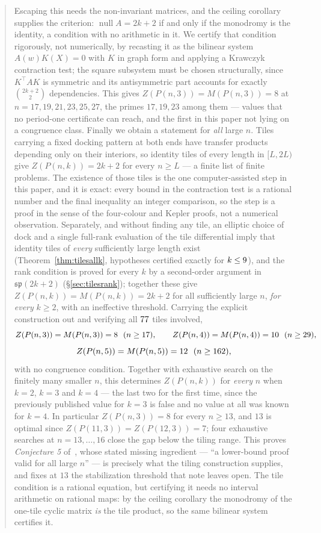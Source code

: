 \documentclass[11pt]{article}
\theoremstyle{definition}
\begin{document}
\begin{abstract}
Escaping this needs the non-invariant matrices, and the ceiling corollary
supplies the criterion: $\operatorname{null}A=2k+2$ if and only if the monodromy
is the identity, a condition with no arithmetic in it. We certify that condition
rigorously, not numerically, by recasting it as the bilinear system $A(w)K(X)=0$
with $K$ in graph form and applying a Krawczyk contraction test; the square
subsystem must be chosen structurally, since $K^{\!\top}\!AK$ is symmetric and
its antisymmetric part accounts for exactly $\binom{2k+2}2$ dependencies. This
gives $Z(P(n,3))=M(P(n,3))=8$ at $n=17,19,21,23,25,27$, the primes $17,19,23$
among them --- values that no period-one certificate can reach, and the first in
this paper not lying on a congruence class. Finally we obtain a statement for \emph{all}
large $n$. Tiles carrying a fixed docking pattern at both ends have transfer
products depending only on their interiors, so identity tiles of every length in
$[L,2L)$ give $Z(P(n,k))=2k+2$ for every $n\ge L$ --- a finite list of finite
problems. The existence of those tiles is the one computer-assisted step in
this paper, and it is exact: every bound in the contraction test is a rational
number and the final inequality an integer comparison, so the step is a proof
in the sense of the four-colour and Kepler proofs, not a numerical observation.
Separately, and without finding any tile, an elliptic choice of dock and a
single full-rank evaluation of the tile differential imply that identity tiles
of \emph{every} sufficiently large length exist (Theorem~\ref{thm:tilesallk},
hypotheses certified exactly for $k\le\TileAllK$), and the rank condition is proved for every $k$ by a second-order argument in
$\mathfrak{sp}(2k+2)$ (\S\ref{sec:tilesrank}); together these give
$Z(P(n,k))=M(P(n,k))=2k+2$ for all sufficiently large $n$, \emph{for every}
$k\ge2$, with an ineffective threshold. Carrying the explicit construction out and verifying all $\NtileAll$ tiles involved,
\[
  Z(P(n,3))=M(P(n,3))=8\ \ (n\ge17),\qquad
  Z(P(n,4))=M(P(n,4))=10\ \ (n\ge\SettleFour),
\]
\[
  Z(P(n,5))=M(P(n,5))=12\ \ (n\ge\SettleFive),
\]
with no congruence condition. Together with exhaustive search on the finitely
many smaller $n$, this determines $Z(P(n,k))$ for \emph{every} $n$ when $k=2$,
$k=3$ and $k=4$ --- the last two for the first time, since the previously
published value for $k=3$ is false and no value at all was known for $k=4$. In particular $Z(P(n,3))=8$ for every $n\ge13$, and $13$ is optimal since
$Z(P(11,3))=Z(P(12,3))=7$; four exhaustive searches at $n=13,\dots,16$ close the
gap below the tiling range. This proves \emph{Conjecture 5} of~\cite{K}, whose
stated missing ingredient --- ``a lower-bound proof valid for all large $n$'' ---
is precisely what the tiling construction supplies, and fixes at $13$ the
stabilization threshold that note leaves open. The tile condition is a rational equation, but
certifying it needs no interval arithmetic on rational maps: by the ceiling
corollary the monodromy of the one-tile cyclic matrix \emph{is} the tile product,
so the same bilinear system certifies it.


\end{abstract}
\end{document}
